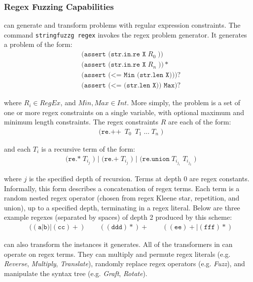 \subsubsection{Regex Fuzzing Capabilities}

\fuzzer{} can generate
and transform problems with regular expression constraints. The
command \texttt{stringfuzzg regex} invokes the regex problem
generator. It generates a problem of the form:
\begin{align*}
    & \texttt{(assert (str.in.re X}\; R_0\; \texttt{))} \\
    & \texttt{(assert (str.in.re X}\; R_n\; \texttt{))}* \\
    & \texttt{(assert (<= Min (str.len X)))}? \\
    & \texttt{(assert (<= (str.len X)) Max)}?
\end{align*}

where $R_i \in RegEx$, and $Min, Max \in Int$. More simply, the
problem is a set of one or more regex constraints on a single
variable, with optional maximum and minimum length constraints. The
regex constraints $R$ are each of the form:
\begin{align*}
  & \texttt{(re.++}\; \ T_0\; \ T_1\; \texttt{...}\; T_n\; \texttt{)}
\end{align*}

and each $T_i$ is a recursive term of the form:
\begin{align*}
  & \texttt{(re.*}\; T_{i_j}\; \texttt{) | (re.+}\; T_{i_j}\;
  \texttt{) | (re.union}\; T_{i_{j_1}}\; T_{i_{j_2}}\; \texttt{)}
\end{align*}

where $j$ is the specified depth of recursion. Terms at depth 0 are
regex constants. Informally, this form describes a concatenation of
regex terms. Each term is a random nested regex operator (chosen from
regex Kleene star, repetition, and union), up to a specified depth,
terminating in a regex literal. Below are three example regexes
(separated by spaces) of depth 2 produced by this scheme:
\begin{align*}
  & ((\texttt{a}|\texttt{b})|(\texttt{cc})+)\quad\quad
  ((\texttt{ddd})*)+\quad\quad ((\texttt{ee})+|(\texttt{fff})*)
\end{align*}

\fuzzer{} can also transform the instances it generates. All of the
transformers in \transformer{} can operate on regex terms. They can
multiply and permute regex literals (e.g. \textit{Reverse},
\textit{Multiply}, \textit{Translate}), randomly replace regex
operators (e.g. \textit{Fuzz}), and manipulate the syntax tree
(e.g. \textit{Graft}, \textit{Rotate}).

